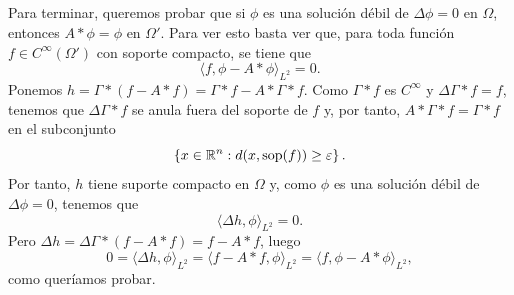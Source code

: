 \documentclass[11pt,a4paper]{amsbook}
\theoremstyle{remark} \newtheorem{rmk}[subsection]{Observación}
\theoremstyle{definition} \newtheorem{defn}[subsection]{Definición}
\theoremstyle{definition} \newtheorem{ex}[subsection]{Ejemplo}
\theoremstyle{definition} \newtheorem{ej}[subsection]{Ejercicio}
\begin{document}
\subsection{} Para terminar, queremos probar que si $\phi$ es una solución débil de $\Delta \phi = 0$ en $\Omega$, entonces $A*\phi = \phi$ en $\Omega'$. Para ver esto basta ver que, para toda función $f\in C^\infty(\Omega')$ con soporte compacto, se tiene que
\begin{equation*}
\langle f, \phi - A*\phi \rangle_{L^2} = 0.
\end{equation*}
Ponemos $h=\Gamma* (f- A*f)= \Gamma*f - A* \Gamma* f$. Como $\Gamma*f$ es $C^\infty$ y $\Delta \Gamma * f = f$, tenemos que $\Delta \Gamma * f$ se anula fuera del soporte de $f$ y, por tanto, $A* \Gamma * f = \Gamma * f$ en el subconjunto
\begin{equation*}
\left\{ x \in \mathbb R^n: d(x,\mathrm{sop}(f)) \geq \varepsilon  \right\}.
\end{equation*}
Por tanto, $h$ tiene suporte compacto en $\Omega$ y, como $\phi$ es una solución débil de $\Delta \phi = 0$, tenemos que
\begin{equation*}
\langle \Delta h, \phi \rangle_{L^2} = 0.
\end{equation*}
Pero $\Delta h = \Delta \Gamma * (f - A* f) = f- A*f$, luego
\begin{equation*}
0= \langle \Delta h, \phi \rangle_{L^2} = \langle f-A*f,\phi \rangle_{L^2} = \langle f, \phi-A*\phi \rangle_{L^2},
\end{equation*}
como queríamos probar.

\end{document}
